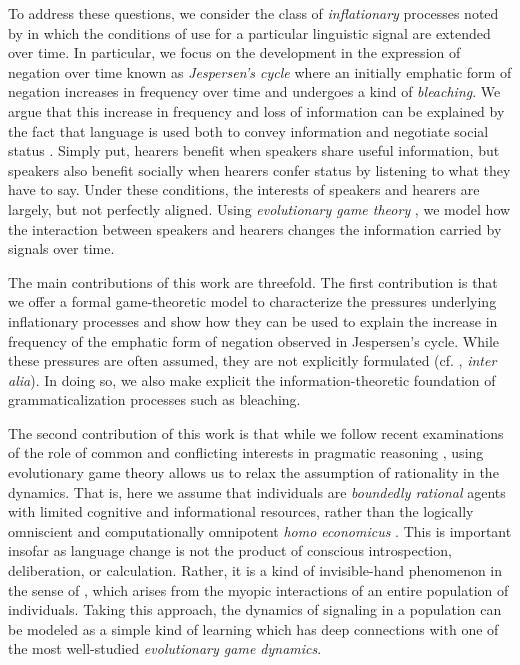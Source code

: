 \documentclass[linguex]{sp}
\theoremstyle{definition} \newtheorem{definition}{Definition}
\begin{document}
To address these questions, we consider the class of \emph{inflationary} processes noted by \cite{dahl:2001} in which the conditions of use for a particular linguistic signal are extended over time. In particular, we focus on the development in the expression of negation over time known as \emph{Jespersen's cycle}  \citeyearpar{jespersen:1917} where an initially emphatic form of negation increases in frequency over time and undergoes a kind of \emph{bleaching}.  We argue that this increase in frequency and loss of information can be explained by the fact that language is used both to convey information and negotiate social status \citep{dessalles2007,franke-etal:2012}. Simply put, hearers benefit when speakers share useful information, but  speakers also benefit socially when hearers confer status by listening to what they have to say. Under these conditions, the interests of speakers and hearers are largely, but not perfectly aligned. Using \emph{evolutionary game theory} \citep{maynard-smith1982}, we model how the interaction between speakers and hearers changes the information carried by signals over time.

The main contributions of this work are threefold. The first contribution is that we offer a formal game-theoretic model to characterize the pressures underlying inflationary processes and show how they can be used to explain the increase in frequency of the emphatic form of negation observed in Jespersen's cycle. While these pressures are often assumed, they are not explicitly formulated (cf. \citealt{detges-waltereit2002, hopper-traugottt2003, kiparsky-condoravdi:2006}, \emph{inter alia}). In doing so, we also make explicit the information-theoretic foundation of grammaticalization processes such as bleaching. 

The second contribution of this work is that while we follow recent examinations of the role of common and conflicting interests in pragmatic reasoning \citep{benz-jager-van-rooij:2006, franke-etal:2012, de-jaegher-van-rooij:2013}, using evolutionary game theory allows us to relax the assumption of rationality in the dynamics. That is, here we assume that individuals are \emph{boundedly rational} agents with limited cognitive and informational resources, rather than the logically omniscient and  computationally omnipotent \emph{homo economicus} \citep{simon1955}. This is important insofar as language change is not the product of conscious introspection, deliberation, or calculation. Rather, it is a kind of invisible-hand phenomenon in the sense of \cite{Keller:1994}, which arises from the myopic interactions of an entire population of individuals.  Taking this approach, the dynamics of signaling in a population can be modeled as a simple kind of learning which has deep connections with one of the most well-studied \emph{evolutionary game dynamics}.
\end{document}
